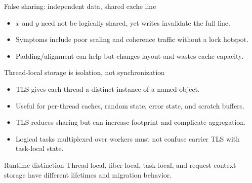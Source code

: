 \documentclass[aspectratio=169,11pt]{beamer}
\begin{document}
\begin{frame}{False sharing: independent data, shared cache line}
  \begin{center}
  \end{center}
  \begin{itemize}
    \item $x$ and $y$ need not be logically shared, yet writes invalidate the full line.
    \item Symptoms include poor scaling and coherence traffic without a lock hotspot.
    \item Padding/alignment can help but changes layout and wastes cache capacity.
  \end{itemize}
\end{frame}

\begin{frame}{Thread-local storage is isolation, not synchronization}
  \begin{itemize}
    \item TLS gives each thread a distinct instance of a named object.

    \item Useful for per-thread caches, random state, error state, and scratch buffers.
    \item TLS reduces sharing but can increase footprint and complicate aggregation.
    \item Logical tasks multiplexed over workers must not confuse carrier TLS with task-local state.
  \end{itemize}
  \begin{alertblock}{Runtime distinction}
    Thread-local, fiber-local, task-local, and request-context storage have different lifetimes and migration behavior.
  \end{alertblock}
\end{frame}
\end{document}
